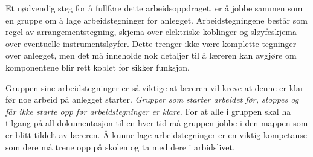 
\vskip 10pt

Et nødvendig steg for å fullføre dette arbeidsoppdraget, er å jobbe sammen som en gruppe om å lage arbeidstegninger for anlegget. Arbeidstegningene består som regel av arrangementstegning, skjema over elektriske koblinger og sløyfeskjema over eventuelle instrumentsløyfer. Dette trenger ikke være komplette tegninger over anlegget, men det må inneholde nok detaljer til å læreren kan avgjøre om komponentene blir rett koblet for sikker funksjon.





Gruppen sine arbeidstegninger er så viktige at læreren vil kreve at denne er klar før noe arbeid på anlegget starter. \textit{Grupper som starter arbeidet før, stoppes og får ikke starte opp før arbeidstegninger er klare.  } For at alle i gruppen skal ha tilgang på all dokumentasjon til en hver tid må gruppen jobbe i den mappen som er blitt tildelt av læreren. Å kunne lage arbeidstegninger er en viktig kompetanse som dere må trene opp på skolen og ta med dere i arbidslivet.  


